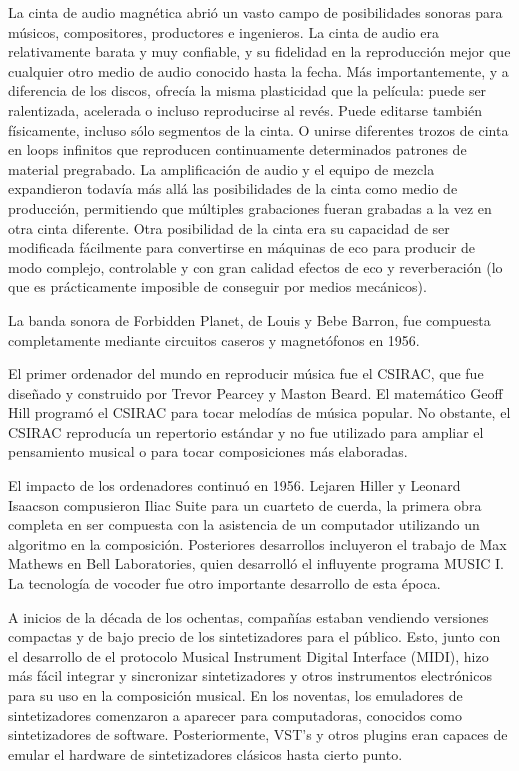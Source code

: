 \documentclass[a4paper,11pt,oneside]{book}
\begin{document}
La cinta de audio magnética abrió un vasto campo de posibilidades sonoras para músicos, compositores, productores e ingenieros. La cinta de audio era relativamente barata y muy confiable, y su fidelidad en la reproducción mejor que cualquier otro medio de audio conocido hasta la fecha. Más importantemente, y a diferencia de los discos, ofrecía la misma plasticidad que la película: puede ser ralentizada, acelerada o incluso reproducirse al revés. Puede editarse también físicamente, incluso sólo segmentos de la cinta. O unirse diferentes trozos de cinta en loops infinitos que reproducen continuamente determinados patrones de material pregrabado. La amplificación de audio y el equipo de mezcla expandieron todavía más allá las posibilidades de la cinta como medio de producción, permitiendo que múltiples grabaciones fueran grabadas a la vez en otra cinta diferente. Otra posibilidad de la cinta era su capacidad de ser modificada fácilmente para convertirse en máquinas de eco para producir de modo complejo, controlable y con gran calidad efectos de eco y reverberación (lo que es prácticamente imposible de conseguir por medios mecánicos).

La banda sonora de Forbidden Planet, de Louis y Bebe Barron, fue compuesta completamente mediante circuitos caseros y magnetófonos en 1956.

El primer ordenador del mundo en reproducir música fue el CSIRAC, que fue diseñado y construido por Trevor Pearcey y Maston Beard. El matemático Geoff Hill programó el CSIRAC para tocar melodías de música popular. No obstante, el CSIRAC reproducía un repertorio estándar y no fue utilizado para ampliar el pensamiento musical o para tocar composiciones más elaboradas.

El impacto de los ordenadores continuó en 1956. Lejaren Hiller y Leonard Isaacson compusieron Iliac Suite para un cuarteto de cuerda, la primera obra completa en ser compuesta con la asistencia de un computador utilizando un algoritmo en la composición. Posteriores desarrollos incluyeron el trabajo de Max Mathews en Bell Laboratories, quien desarrolló el influyente programa MUSIC I. La tecnología de vocoder fue otro importante desarrollo de esta época.

A inicios de la década de los ochentas, compañías estaban vendiendo versiones compactas y de bajo precio de los sintetizadores para el público. Esto, junto con el desarrollo de el protocolo Musical Instrument Digital Interface (MIDI), hizo más fácil integrar y sincronizar sintetizadores y otros instrumentos electrónicos para su uso en la composición musical. En los noventas, los emuladores de sintetizadores comenzaron a aparecer para computadoras, conocidos como sintetizadores de software. Posteriormente, VST's y otros plugins eran capaces de emular el hardware de sintetizadores clásicos hasta cierto punto.
\end{document}
